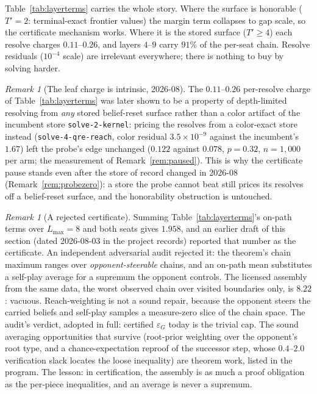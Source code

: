 \documentclass[11pt]{article}
\theoremstyle{plain}
\theoremstyle{definition}
\theoremstyle{remark}
\newtheorem{remark}[theorem]{Remark}
\newcommand{\code}[1]{\texttt{\small #1}}
\newcommand{\game}{\ensuremath{G}}
\newcommand{\epsG}{\ensuremath{\varepsilon_{\game}}}
\begin{document}
Table~\ref{tab:layerterms} carries the whole story. Where the surface
is honorable ($T'{=}2$: terminal-exact frontier values) the margin
term collapses to gap scale, so the certificate mechanism works. Where
it is the stored surface ($T'\ge4$) each resolve charges
$0.11$--$0.26$, and layers $4$--$9$ carry $91\%$ of the per-seat
chain. Resolve residuals ($10^{-4}$ scale) are irrelevant everywhere;
there is nothing to buy by solving harder.

\begin{remark}[The leaf charge is intrinsic, 2026-08]
\label{rem:intrinsic}
The $0.11$--$0.26$ per-resolve charge of Table~\ref{tab:layerterms}
was later shown to be a property of depth-limited resolving from
\emph{any} stored belief-reset surface rather than a color artifact
of the incumbent store \code{solve-2-kernel}: pricing the resolves
from a color-exact store instead (\code{solve-4-qre-reach}, color
residual $3.5\times10^{-9}$ against the incumbent's $1.67$) left the
probe's edge unchanged ($0.122$ against $0.078$, $p=0.32$,
$n=1{,}000$ per arm; the measurement of Remark~\ref{rem:paused}).
This is why the certificate pause stands even after the store of
record changed in 2026-08 (Remark~\ref{rem:probezero}): a store the
probe cannot beat still prices its resolves off a belief-reset
surface, and the honorability obstruction is untouched.
\end{remark}

\begin{remark}[A rejected certificate]\label{rem:rejected}
Summing Table~\ref{tab:layerterms}'s on-path terms over $L_{\max}=8$
and both seats gives $1.958$, and an earlier draft of this section
(dated 2026-08-03 in the project records) reported that number as the
certificate. An independent adversarial audit rejected it: the
theorem's chain maximum ranges over \emph{opponent-steerable} chains,
and an on-path mean substitutes a self-play average for a supremum the
opponent controls. The licensed assembly from the same data, the worst
observed chain over visited boundaries only, is $8.22$: vacuous.
Reach-weighting is not a sound repair, because the opponent steers the
carried beliefs and self-play samples a measure-zero slice of the
chain space. The audit's verdict, adopted in full: certified $\epsG$
today is the trivial cap. The sound averaging opportunities that
survive (root-prior weighting over the opponent's root type, and a
chance-expectation reproof of the successor step, whose
$0.4$--$2.0$ verification slack locates the loose inequality) are
theorem work, listed in the program. The lesson: in certification, the
assembly is as much a proof obligation as the per-piece inequalities,
and an average is never a supremum.
\end{remark}
\end{document}
